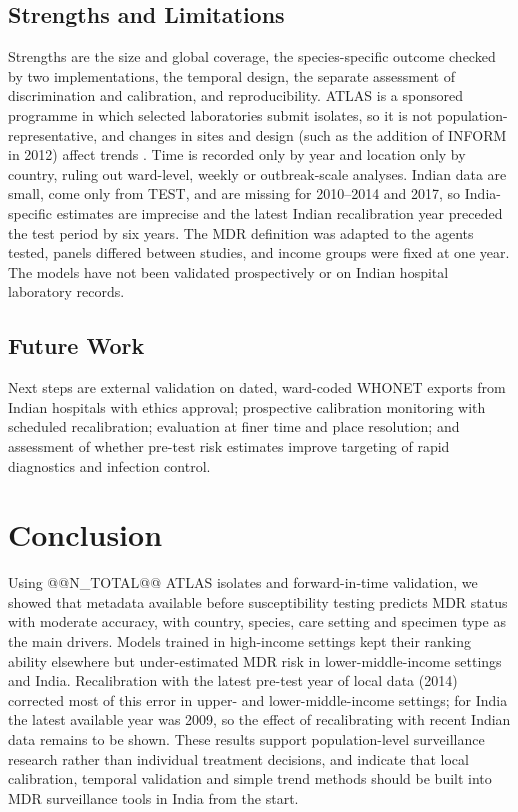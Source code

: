 \documentclass[conference]{IEEEtran}
\begin{document}
\subsection{Strengths and Limitations}\label{sec:limitations}
Strengths are the size and global coverage, the species-specific outcome checked by two implementations, the temporal design, the separate assessment of discrimination and calibration, and reproducibility. ATLAS is a sponsored programme in which selected laboratories submit isolates, so it is not population-representative, and changes in sites and design (such as the addition of INFORM in 2012) affect trends \cite{catalan2022}. Time is recorded only by year and location only by country, ruling out ward-level, weekly or outbreak-scale analyses. Indian data are small, come only from TEST, and are missing for 2010--2014 and 2017, so India-specific estimates are imprecise and the latest Indian recalibration year preceded the test period by six years. The MDR definition was adapted to the agents tested, panels differed between studies, and income groups were fixed at one year. The models have not been validated prospectively or on Indian hospital laboratory records.

\subsection{Future Work}
Next steps are external validation on dated, ward-coded WHONET exports from Indian hospitals with ethics approval; prospective calibration monitoring with scheduled recalibration; evaluation at finer time and place resolution; and assessment of whether pre-test risk estimates improve targeting of rapid diagnostics and infection control.

\section{Conclusion}\label{sec:conclusion}
Using @@N_TOTAL@@ ATLAS isolates and forward-in-time validation, we showed that metadata available before susceptibility testing predicts MDR status with moderate accuracy, with country, species, care setting and specimen type as the main drivers. Models trained in high-income settings kept their ranking ability elsewhere but under-estimated MDR risk in lower-middle-income settings and India. Recalibration with the latest pre-test year of local data (2014) corrected most of this error in upper- and lower-middle-income settings; for India the latest available year was 2009, so the effect of recalibrating with recent Indian data remains to be shown. These results support population-level surveillance research rather than individual treatment decisions, and indicate that local calibration, temporal validation and simple trend methods should be built into MDR surveillance tools in India from the start.
\end{document}
